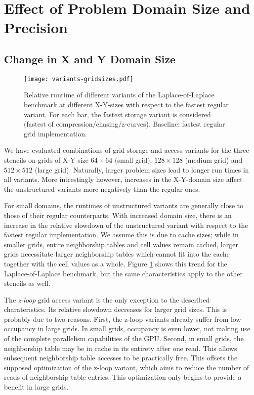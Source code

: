 \section{Effect of Problem Domain Size and Precision} \label{sec:res-size}

\subsection{Change in X and Y Domain Size}

\begin{figure}
	\texttt{[image: variants-gridsizes.pdf]}
	\caption{\label{fig:variants-gridsizes} Relative runtime of different variants of the Laplace-of-Laplace benchmark at different X-Y-sizes with respect to the fastest regular variant. For each bar, the fastest storage variant is considered (fastest of compression/chasing/z-curves). Baseline: fastest regular grid implementation.}
\end{figure}

We have evaluated combinations of grid storage and access variants for the three stencils on grids of X-Y size $64\times 64$ (small grid), $128\times 128$ (medium grid) and $512\times 512$ (large grid). Naturally, larger problem sizes lead to longer run times in all variants. More intrestingly however, increases in the X-Y-domain size affect the unstructured variants more negatively than the regular ones.

For small domains, the runtimes of unstructured variants are generally close to those of their regular counterparts. With increased domain size, there is an increase in the relative slowdown of the unstructured variant with respect to the fastest regular implementation. We assume this is due to cache sizes; while in smaller grids, entire neighborship tables and cell values remain cached, larger grids necessitate larger neighborship tables which cannot fit into the cache together with the cell values as a whole. Figure \ref{fig:variants-gridsizes} shows this trend for the Laplace-of-Laplace benchmark, but the same characteristics apply to the other stencils as well.

The \emph{z-loop} grid access variant is the only exception to the described charateristics. Its relative slowdown decreases for larger grid sizes. This is probably due to two reasons. First, the z-loop variants already suffer from low occupancy in large grids. In small grids, occupancy is even lower, not making use of the complete parallelism capabilities of the GPU. Second, in small grids, the neighborship table may be in cache in its entirety after one read. This allows subsequent neighborship table accesses to be practically free. This offsets the supposed optimization of the z-loop variant, which aims to reduce the number of reads of neighborship table entries. This optimization only begins to provide a benefit in large grids.

